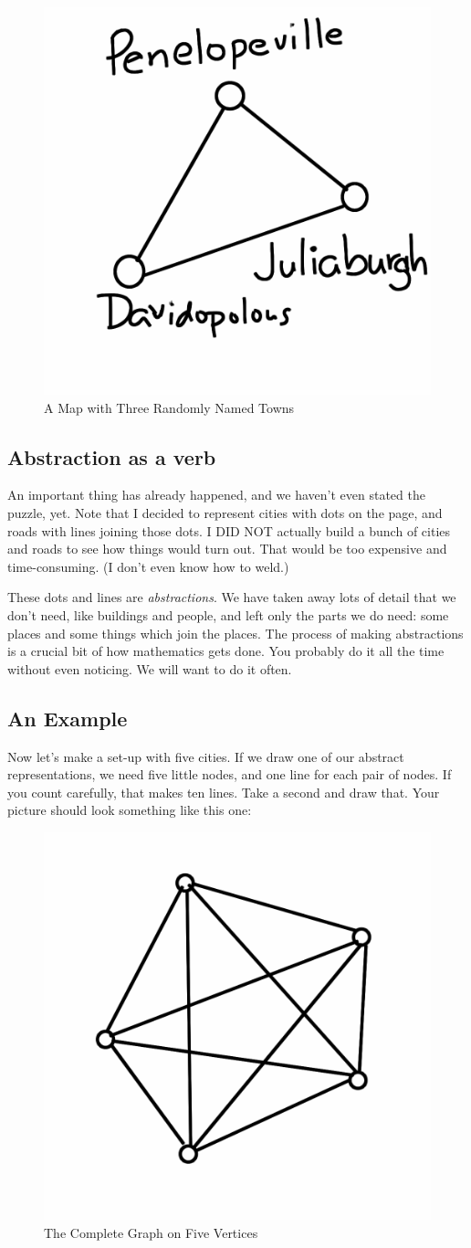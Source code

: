 \documentclass[12pt,letterpaper]{article}
\theoremstyle{definition}
\begin{document}
\begin{figure}[h]
\centering
\includegraphics[width=.4\textwidth]{images/ThreeTowns.png}
\caption{A Map with Three Randomly Named Towns}
\end{figure}


\subsection*{Abstraction as a verb}

An important thing has already happened, and we haven't even stated the puzzle, yet.  Note that I decided to represent cities with dots on the page, and roads with lines joining those dots. I DID NOT actually build a bunch of cities and roads to see how things would turn out. That would be too expensive and time-consuming. (I don't even know
how to weld.)

These dots and lines are \emph{abstractions}. We have taken away lots of detail that we don't need, like buildings and people, and left only the parts we do need: some places and some things which join the places. The process of making abstractions is a crucial bit of how mathematics gets done. You probably do it all the time without even noticing. We will want to do it often.

\subsection*{An Example}

Now let's make a set-up with five cities. If we draw one of our abstract representations, we need five little nodes,
and one line for each pair of nodes. If you count carefully, that makes ten lines. Take a second and draw that. 
Your picture should look something like this one:

\begin{figure}[h]
\centering
\includegraphics[width=.5\textwidth]{images/k5.png}
\caption{The Complete Graph on Five Vertices}
\end{figure}
\end{document}

